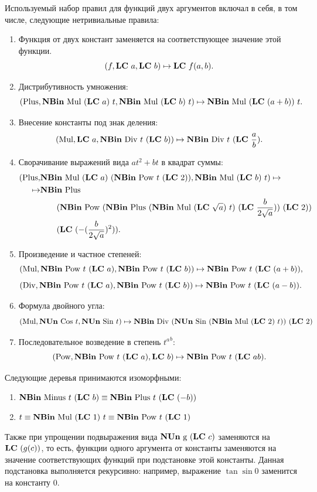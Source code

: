 \documentclass[12pt,a4paper]{article}
\begin{document}
Используемый набор правил для функций двух аргументов включал в себя, в том числе,
следующие нетривиальные правила:
\begin{enumerate}
  \item Функция от двух констант заменяется на соответствующее значение этой функции.
	\[
	(f, \mathbf{LC}\  a, \mathbf{LC}\  b) \mapsto \mathbf{LC}\  f (a, b).
	\]
  \item Дистрибутивность умножения:
	\[
	(\text{Plus}, \mathbf{NBin}\ \text{Mul}\  (\mathbf{LC}\  a)\ t, \mathbf{NBin}\ \text{Mul}\  (\mathbf{LC}\  b)\ t) \mapsto \mathbf{NBin}\ \text{Mul}\  (\mathbf{LC}\  (a + b))\ t.
	\]
  \item Внесение константы под знак деления:
	\[
	(\text{Mul}, \mathbf{LC}\  a, \mathbf{NBin}\ \text{Div}\  t\ (\mathbf{LC}\  b)) \mapsto \mathbf{NBin}\ \text{Div}\  t\ (\mathbf{LC}\  \frac{a}{b}).
	\]
  \item Сворачивание выражений вида $at^2 + bt$ в квадрат суммы:
	\begin{align}
	  (\text{Plus}, &\mathbf{NBin}\ \text{Mul}\  (\mathbf{LC}\  a)\ (\mathbf{NBin}\ \text{Pow}\  t\ (\mathbf{LC}\  2)), \mathbf{NBin}\ \text{Mul}\  (\mathbf{LC}\  b)\ t) \mapsto \nonumber\\
		\mapsto &\mathbf{NBin}\ \text{Plus}\ \nonumber\\
				&\ \ \ \ \ \ (\mathbf{NBin}\ \text{Pow}\  (\mathbf{NBin}\ \text{Plus}\  (\mathbf{NBin}\ \text{Mul}\  (\mathbf{LC}\  \sqrt a)\ t)\ (\mathbf{LC}\  \frac{b}{2 \sqrt a}))\ (\mathbf{LC}\  2))\nonumber\\
				&\ \ \ \ \ \ (\mathbf{LC}\  (-(\frac{b}{2 \sqrt a})^2)).\nonumber
	\end{align}
  \item Произведение и частное степеней:
	\[
	(\text{Mul}, \NBin{Pow} t\ (\LC a), \NBin{Pow} t\ (\LC b)) \mapsto \NBin{Pow} t\ (\LC (a + b)),
	\]
	\[
	(\text{Div}, \NBin{Pow} t\ (\LC a), \NBin{Pow} t\ (\LC b)) \mapsto \NBin{Pow} t\ (\LC (a - b)).
	\]
  \item Формула двойного угла:
	\[
	(\text{Mul}, \mathbf{NUn}\ \text{Cos}\  t, \mathbf{NUn}\ \text{Sin}\  t) \mapsto \mathbf{NBin}\ \text{Div}\  (\mathbf{NUn}\ \text{Sin}\  (\mathbf{NBin}\ \text{Mul}\  (\mathbf{LC}\  2)\ t))\ (\mathbf{LC}\  2)
	\]
  \item Последовательное возведение в степень ${t^a}^b$:
	\[
	(\text{Pow}, \mathbf{NBin}\ \text{Pow}\  t\ (\mathbf{LC}\  a), \mathbf{LC}\  b) \mapsto \mathbf{NBin}\ \text{Pow}\  t\ (\mathbf{LC}\  ab).
	\]
\end{enumerate}

Следующие деревья принимаются изоморфными:
\begin{enumerate}
  \item $\mathbf{NBin}\ \text{Minus}\  t\ (\mathbf{LC}\  b) \equiv \mathbf{NBin}\ \text{Plus}\  t\ (\mathbf{LC}\  (-b))$
  \item $t \equiv \mathbf{NBin}\ \text{Mul}\  (\mathbf{LC}\  1)\ t \equiv \mathbf{NBin}\ \text{Pow}\  t\ (\mathbf{LC}\  1)$
\end{enumerate}

Также при упрощении подвыражения вида $\mathbf{NUn}\ \text{g}\  (\mathbf{LC}\  c)$ заменяются на $\mathbf{LC}\  (g (c))$,
то есть, функции одного аргумента от константы заменяются на значение
соответствующих функций при подстановке этой константы. Данная подстановка
выполняется рекурсивно: например, выражение $\tan \sin 0$ заменится на
константу $0$.
\end{document}
